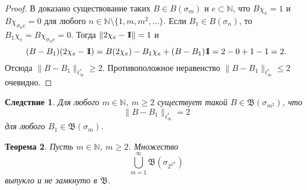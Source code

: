\documentclass[12pt]{article}
\newcommand{\emm}{\mathrm{1\hspace{-0.3em} I}}
\newtheorem{thm}{Теорема}
\newtheorem{cor}[thm]{Следствие}
\def\N{{\mathbb{N}}}
\def\B{{\mathfrak{B}}}
\begin{document}
\begin{proof}
В \cite[T. 9]{ASSU2} доказано существование таких $B\in B(\sigma_m)$ и $e\subset \N$, что $B\chi_e =1$ и $B\chi_{\sigma_ne} =0$ для любого $n\in\N\setminus \{1, m, m^2, \dots\}$. Если $B_1\in B(\sigma_n)$, то $B_1\chi_e =B\chi_{\sigma_ne} =0$. Тогда $\|2\chi_e-\emm\|=1$ и
$$(B-B_1)(2\chi_e-\emm)=B(2\chi_e)-B_1\chi_e+(B-B_1)\emm=2-0+1-1=2.$$
Отсюда $\|B-B_1\|_{\ell_\infty^*}\ge2$. Противоположное неравенство $\|B-B_1\|_{\ell_\infty^*}\le2$ очевидно.
\end{proof}

\begin{cor}\label{dl_cor}
Для любого $m\in \N$, $m\ge2$ существует такой $B\in \B(\sigma_{m^2})$, что
$$\|B-B_1\|_{\ell_\infty^*}=2 $$
 для любого $B_1\in \B(\sigma_m)$.
\end{cor}

\begin{thm}
Пусть $m\in \N$, $m\ge2$. Множество
\begin{equation}\label{dl4}
\bigcup_{m=1}^\infty\mathfrak B(\sigma_{2^{2^m}})
\end{equation}
выпукло и не замкнуто в $\B$.
\end{thm}
\end{document}
